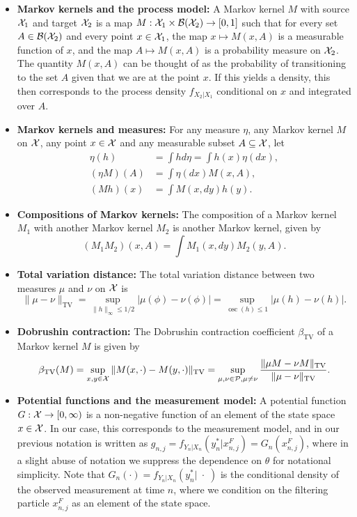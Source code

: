 \begin{itemize}
\item \textbf{Markov kernels and the process model:} A Markov kernel $M$ with source ${\mathcal{X}}_1$ and target ${\mathcal{X}}_2$ is a map $M: {\mathcal{X}}_1 \times \mathcal{B}({\mathcal{X}}_2) \to [0,1]$ such that for every set $A \in \mathcal{B}({\mathcal{X}}_2)$ and every point $x \in {\mathcal{X}}_1$, the map $x \mapsto M(x, A)$ is a measurable function of $x$, and the map $A \mapsto M(x,A)$ is a probability measure on ${\mathcal{X}}_2$. The quantity $M(x,A)$ can be thought of as the probability of transitioning to the set $A$ given that we are at the point $x$. If this yields a density, this then corresponds to the process density $f_{X_{2}|X_1}$ conditional on $x$ and integrated over $A$.  
\item \textbf{Markov kernels and measures:} For any measure $\eta$, any Markov kernel $M$ on ${\mathcal{X}}$, any point $x \in {\mathcal{X}}$ and any measurable subset $A \subseteq {\mathcal{X}}$, let 
\begin{align*}
    \eta(h) &= \int h d\eta = \int h(x) \eta(dx), \\(\eta M)(A) &= \int \eta(dx)M(x,A), \\
    (Mh)(x) &= \int M(x, dy) h(y).
\end{align*}
\item \textbf{Compositions of Markov kernels:} The composition of a Markov kernel $M_1$ with another Markov kernel $M_2$ is another Markov kernel, given by 
$$(M_1M_2)(x, A) = \int M_1(x, dy) M_2(y, A).$$
\item \textbf{Total variation distance:} The total variation distance between two measures $\mu$ and $\nu$ on ${\mathcal{X}}$ is
$$\|\mu-\nu\|_{\mathrm{TV}}=\sup _{\|h\|_{\infty} \leq 1 / 2}|\mu(\phi)-\nu(\phi)|=\sup _{\operatorname{osc}(h) \leq 1}|\mu(h)-\nu(h)|.$$
\item \textbf{Dobrushin contraction:} The Dobrushin contraction coefficient $\beta_{\text{TV}}$ of a Markov kernel $M$ is given by
$$\beta_{\mathrm{TV}}(M)=\sup _{x, y \in {\mathcal{X}}}\|M(x, \cdot)-M(y, \cdot)\|_{\mathrm{TV}}=\sup _{\mu, \nu \in \mathcal{P}, \mu \neq \nu} \frac{\|\mu M-\nu M\|_{\mathrm{TV}}}{\|\mu-\nu\|_{\mathrm{TV}}}.$$
\item \textbf{Potential functions and the measurement model:} A potential function $G : {\mathcal{X}} \to [0,\infty)$ is a non-negative function of an element of the state space $x \in {\mathcal{X}}$. In our case, this corresponds to the measurement model, and in our previous notation is written as $g_{n,j} = f_{Y_n|X_n}(y_n^*|x_{n,j}^F) = G_n(x_{n,j}^F)$, where in a slight abuse of notation we suppress the dependence on $\theta$ for notational simplicity. Note that $G_n(\cdot) = f_{Y_n|X_n}(y_n^*|\;\cdot\;)$ is the conditional density of the observed measurement at time $n$, where we condition on the filtering particle $x_{n,j}^F$ as an element of the state space. 

\end{itemize}
